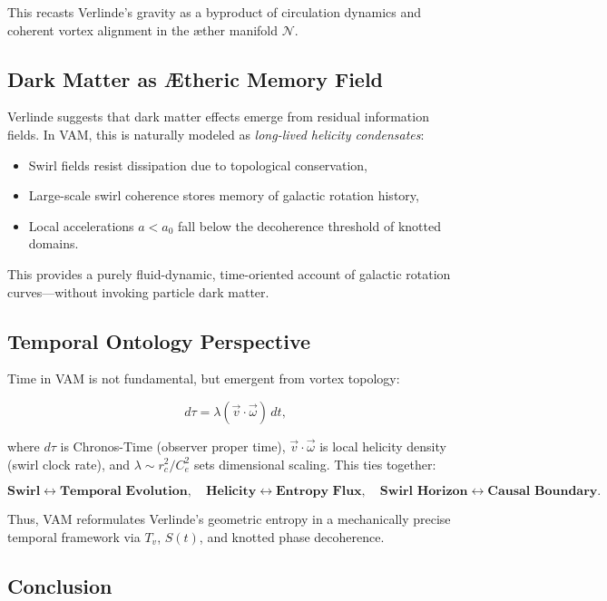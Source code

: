 This recasts Verlinde’s gravity as a byproduct of circulation dynamics and coherent vortex alignment in the æther manifold \( \mathcal{N} \).

\subsection*{Dark Matter as Ætheric Memory Field}

Verlinde suggests that dark matter effects emerge from residual information fields. In VAM, this is naturally modeled as \emph{long-lived helicity condensates}:

\begin{itemize}
    \item Swirl fields resist dissipation due to topological conservation,
    \item Large-scale swirl coherence stores memory of galactic rotation history,
    \item Local accelerations \( a < a_0 \) fall below the decoherence threshold of knotted domains.
\end{itemize}

This provides a purely fluid-dynamic, time-oriented account of galactic rotation curves—without invoking particle dark matter.

\subsection*{Temporal Ontology Perspective}

Time in VAM is not fundamental, but emergent from vortex topology:

\begin{equation}
d\tau = \lambda (\vec{v} \cdot \vec{\omega}) \, dt,
\end{equation}

where \( d\tau \) is Chronos-Time (observer proper time), \( \vec{v} \cdot \vec{\omega} \) is local helicity density (swirl clock rate), and \( \lambda \sim r_c^2 / C_e^2 \) sets dimensional scaling. This ties together:

\[
\textbf{Swirl} \leftrightarrow \textbf{Temporal Evolution}, \quad
\textbf{Helicity} \leftrightarrow \textbf{Entropy Flux}, \quad
\textbf{Swirl Horizon} \leftrightarrow \textbf{Causal Boundary}.
\]

Thus, VAM reformulates Verlinde's geometric entropy in a mechanically precise temporal framework via \( T_v \), \( S(t) \), and knotted phase decoherence.

\subsection*{Conclusion}

